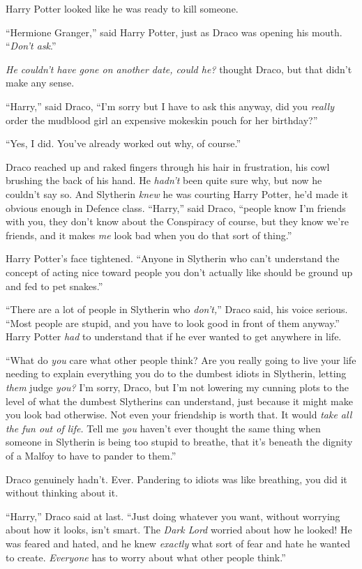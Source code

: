Harry Potter looked like he was ready to kill someone.

“Hermione Granger,” said Harry Potter, just as Draco was opening his mouth. “\emph{Don’t ask}.”

\emph{He couldn’t have gone on another date, could he?} thought Draco, but that didn’t make any sense.

“Harry,” said Draco, “I’m sorry but I have to ask this anyway, did you \emph{really} order the mudblood girl an expensive mokeskin pouch for her birthday?”

“Yes, I did. You’ve already worked out why, of course.”

Draco reached up and raked fingers through his hair in frustration, his cowl brushing the back of his hand. He \emph{hadn’t} been quite sure why, but now he couldn’t say so. And Slytherin \emph{knew} he was courting Harry Potter, he’d made it obvious enough in Defence class. “Harry,” said Draco, “people know I’m friends with you, they don’t know about the Conspiracy of course, but they know we’re friends, and it makes \emph{me} look bad when you do that sort of thing.”

Harry Potter’s face tightened. “Anyone in Slytherin who can’t understand the concept of acting nice toward people you don’t actually like should be ground up and fed to pet snakes.”

“There are a lot of people in Slytherin who \emph{don’t,}” Draco said, his voice serious. “Most people are stupid, and you have to look good in front of them anyway.” Harry Potter \emph{had} to understand that if he ever wanted to get anywhere in life.

“What do \emph{you} care what other people think? Are you really going to live your life needing to explain everything you do to the dumbest idiots in Slytherin, letting \emph{them} judge \emph{you?} I’m sorry, Draco, but I’m not lowering my cunning plots to the level of what the dumbest Slytherins can understand, just because it might make you look bad otherwise. Not even your friendship is worth that. It would \emph{take all the fun out of life.} Tell me \emph{you} haven’t ever thought the same thing when someone in Slytherin is being too stupid to breathe, that it’s beneath the dignity of a Malfoy to have to pander to them.”

Draco genuinely hadn’t. Ever. Pandering to idiots was like breathing, you did it without thinking about it.

“Harry,” Draco said at last. “Just doing whatever you want, without worrying about how it looks, isn’t smart. The \emph{Dark Lord} worried about how he looked! He was feared and hated, and he knew \emph{exactly} what sort of fear and hate he wanted to create. \emph{Everyone} has to worry about what other people think.”

